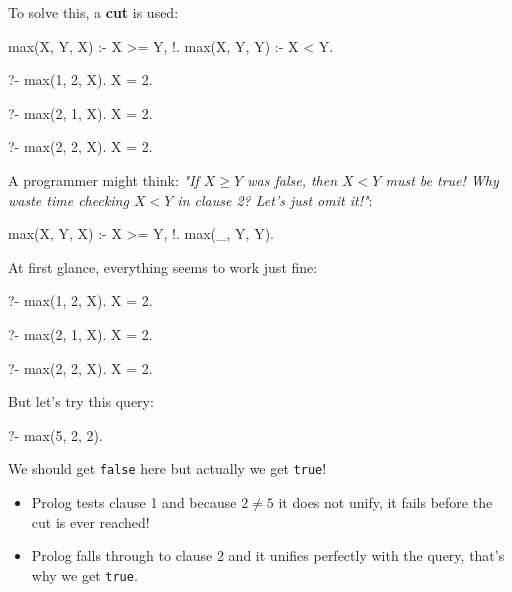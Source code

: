 
To solve this, a \textbf{cut} is used:

\begin{codeblock}
max(X, Y, X) :- X >= Y, !.
max(X, Y, Y) :- X < Y.
\end{codeblock}

\begin{codeblock}
?- max(1, 2, X).
X = 2.

?- max(2, 1, X).
X = 2.             

?- max(2, 2, X).
X = 2.             
\end{codeblock}

A programmer might think: \textit{"If $X \geq Y$ was false, then $X < Y$ must be true! Why waste time checking $X < Y$ in clause 2? Let's just omit it!"}:

\begin{codeblock}
max(X, Y, X) :- X >= Y, !.
max(_, Y, Y). 
\end{codeblock}

At first glance, everything seems to work just fine:

\begin{codeblock}
?- max(1, 2, X).
X = 2.

?- max(2, 1, X).
X = 2.             

?- max(2, 2, X).
X = 2.             
\end{codeblock}

But let's try this query:

\begin{codeblock}
?- max(5, 2, 2).
\end{codeblock}

We should get \texttt{false} here but actually we get \texttt{true}!

\begin{itemize}
    \item Prolog tests clause 1 and because $2 \neq 5$ it does not unify, it fails before the cut is ever reached! 
    \item Prolog falls through to clause 2 and it unifies perfectly with the query, that's why we get \texttt{true}.
\end{itemize}

